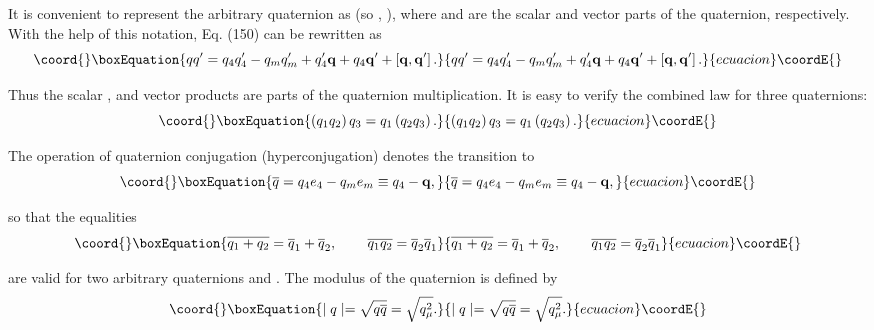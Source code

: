 \documentclass[a4paper,12pt]{article}
\begin{document}
It is convenient to represent the arbitrary quaternion as
\coordHE{} (so \coordHE{}, \coordHE{}), where \coordHE{} and \coordHE{} are the scalar and
vector parts of the quaternion, respectively. With the help of
this notation, Eq. (150) can be rewritten as
\begin{equation}\coord{}\boxEquation{
qq^{\prime }=q_4q_4^{\prime }-q_mq_m^{\prime }+q_4^{\prime
}\mathbf{q}+q_4 \mathbf{q}^{\prime }+\left[
\mathbf{q},\mathbf{q}^{\prime }\right] . \label{151}
}{
qq^{\prime }=q_4q_4^{\prime }-q_mq_m^{\prime }+q_4^{\prime
}\mathbf{q}+q_4 \mathbf{q}^{\prime }+\left[
\mathbf{q},\mathbf{q}^{\prime }\right] . }{ecuacion}\coordE{}\end{equation}

Thus the scalar \coordHE{}, and vector\thinspace {}\coordHE{} products are parts of
the quaternion multiplication. It is easy to verify the combined
law for three quaternions:
\begin{equation}\coord{}\boxEquation{
\left( q_1q_2\right) q_3=q_1\left( q_2q_3\right) .  \label{152}
}{
\left( q_1q_2\right) q_3=q_1\left( q_2q_3\right) .  }{ecuacion}\coordE{}\end{equation}

The operation of quaternion conjugation (hyperconjugation) denotes
the transition to
\begin{equation}\coord{}\boxEquation{
\overline{q}=q_4e_4-q_me_m\equiv q_4-\mathbf{q},  \label{153}
}{
\overline{q}=q_4e_4-q_me_m\equiv q_4-\mathbf{q},  }{ecuacion}\coordE{}\end{equation}

so that the equalities
\begin{equation}\coord{}\boxEquation{
\overline{q_1+q_2}=\overline{q}_1+\overline{q}_2,\hspace{0.3in}
\overline{q_1q_2}=\overline{q}_2\overline{q}_1  \label{154}
}{
\overline{q_1+q_2}=\overline{q}_1+\overline{q}_2,\hspace{0.3in}
\overline{q_1q_2}=\overline{q}_2\overline{q}_1  }{ecuacion}\coordE{}\end{equation}

are valid for two arbitrary quaternions \coordHE{} and \coordHE{}. The
modulus of the quaternion \coordHE{} is defined by
\begin{equation}\coord{}\boxEquation{
\mid q\mid =\sqrt{q\overline{q}}=\sqrt{q_\mu ^2}.  \label{155}
}{
\mid q\mid =\sqrt{q\overline{q}}=\sqrt{q_\mu ^2}.  }{ecuacion}\coordE{}\end{equation}
\end{document}
